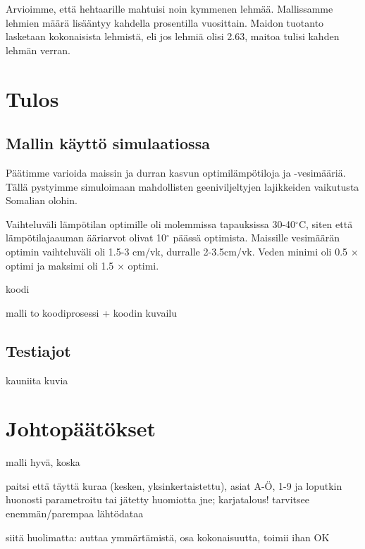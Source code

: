 \documentclass[12pt]{scrreprt}
\begin{document}
  Arvioimme, että hehtaarille mahtuisi noin kymmenen lehmää. Mallissamme lehmien
  määrä lisääntyy kahdella prosentilla vuosittain. Maidon tuotanto lasketaan
  kokonaisista lehmistä, eli jos lehmiä olisi 2.63, maitoa tulisi kahden lehmän
  verran.

  \chapter{Tulos}

  \section{Mallin käyttö simulaatiossa}

  Päätimme varioida maissin ja durran kasvun optimilämpötiloja ja -vesimääriä.
  Tällä pystyimme simuloimaan mahdollisten geeniviljeltyjen lajikkeiden
  vaikutusta Somalian olohin.

  Vaihteluväli lämpötilan optimille oli molemmissa tapauksissa 30-40$^{\circ}$C,
  siten että lämpötilajaauman ääriarvot olivat 10$^{\circ}$ päässä optimista.
  Maissille vesimäärän optimin vaihteluväli oli 1.5-3 cm/vk, durralle
  2-3.5cm/vk. Veden minimi oli 0.5 $\times$ optimi ja maksimi oli 1.5 $\times$
  optimi.

  koodi

  malli to koodiprosessi + koodin kuvailu

  \section{Testiajot}

  kauniita kuvia

  \chapter{Johtopäätökset}

  malli hyvä, koska
  
  paitsi että täyttä kuraa (kesken, yksinkertaistettu), asiat A-Ö, 1-9 ja
  loputkin huonosti parametroitu tai jätetty huomiotta jne; karjatalous!
  tarvitsee enemmän/parempaa lähtödataa
  
  siitä huolimatta: auttaa ymmärtämistä, osa kokonaisuutta, toimii ihan OK
\end{document}
